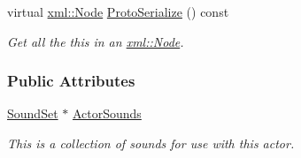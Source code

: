 \begin{DoxyCompactItemize}
virtual \hyperlink{classphys_1_1xml_1_1Node}{xml::Node} \hyperlink{classphys_1_1ActorBase_ade19dd1c6703264cba492cfd95590755}{ProtoSerialize} () const 
\begin{DoxyCompactList}\small\item\em Get all the this in an \hyperlink{classphys_1_1xml_1_1Node}{xml::Node}. \item\end{DoxyCompactList}\end{DoxyCompactItemize}
\subsubsection*{Public Attributes}
\begin{DoxyCompactItemize}
\item 
\hypertarget{classphys_1_1ActorBase_a2d56e2b3470bfc7dfc6d9ce8c4158d81}{
\hyperlink{classphys_1_1SoundSet}{SoundSet} $\ast$ \hyperlink{classphys_1_1ActorBase_a2d56e2b3470bfc7dfc6d9ce8c4158d81}{ActorSounds}}
\label{d8/d0f/classphys_1_1ActorBase_a2d56e2b3470bfc7dfc6d9ce8c4158d81}

\begin{DoxyCompactList}\small\item\em This is a collection of sounds for use with this actor. \item\end{DoxyCompactList}\end{DoxyCompactItemize}
